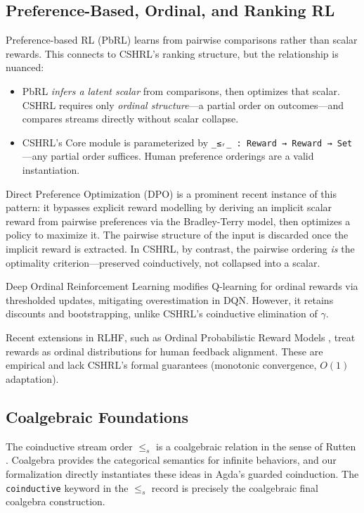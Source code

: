 \documentclass[9pt,a4paper]{article}
\theoremstyle{plain}
\theoremstyle{definition}
\theoremstyle{remark}
\begin{document}
\subsection{Preference-Based, Ordinal, and Ranking RL}

Preference-based RL (PbRL) \cite{Wirth2017} learns from pairwise comparisons rather than scalar rewards. This connects to CSHRL's ranking structure, but the relationship is nuanced:
\begin{itemize}
\item PbRL \emph{infers a latent scalar} from comparisons, then optimizes that scalar. CSHRL requires only \emph{ordinal structure}---a partial order on outcomes---and compares streams directly without scalar collapse.
\item CSHRL's Core module is parameterized by \texttt{\_≤ᵣ\_ : Reward → Reward → Set}---any partial order suffices. Human preference orderings are a valid instantiation.
\end{itemize}

\noindent Direct Preference Optimization (DPO) \cite{Rafailov2023} is a prominent recent instance of this pattern: it bypasses explicit reward modelling by deriving an implicit scalar reward from pairwise preferences via the Bradley-Terry model, then optimizes a policy to maximize it.  The pairwise structure of the input is discarded once the implicit reward is extracted.  In CSHRL, by contrast, the pairwise ordering \emph{is} the optimality criterion---preserved coinductively, not collapsed into a scalar.

Deep Ordinal Reinforcement Learning \cite{Zap2019} modifies Q-learning for ordinal rewards via thresholded updates, mitigating overestimation in DQN. However, it retains discounts and bootstrapping, unlike CSHRL's coinductive elimination of $\gamma$.

Recent extensions in RLHF, such as Ordinal Probabilistic Reward Models \cite{Anonymous2025}, treat rewards as ordinal distributions for human feedback alignment. These are empirical and lack CSHRL's formal guarantees (monotonic convergence, $O(1)$ adaptation).

\subsection{Coalgebraic Foundations}

The coinductive stream order $\le_s$ is a coalgebraic relation in the sense of Rutten \cite{Rutten2000}. Coalgebra provides the categorical semantics for infinite behaviors, and our formalization directly instantiates these ideas in Agda's guarded coinduction. The \texttt{coinductive} keyword in the $\le_s$ record is precisely the coalgebraic final coalgebra construction.
\end{document}

